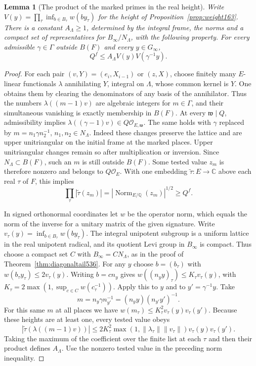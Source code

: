 \documentclass[a4paper,11pt]{article}
\newtheorem{lemma}[proposition]{Lemma}
\theoremstyle{definition}
\theoremstyle{remark}
\numberwithin{equation}{section}
\begin{document}
\begin{lemma}[The product of the marked primes in the real height]
\leavevmode\label{lem:frameheight540}
Write \(V(y)=\prod_\tau\inf_{b\in B_\tau}w(by_\tau)\) for the
height of Proposition~\ref{prop:weight163}. There is a constant
\(A_\Lambda\ge1\), determined by the integral frame, the norms
and a compact set of representatives for \(B_\infty/N_\Lambda\),
with the following property. For every admissible \(\gamma\in\Gamma\)
outside \(B(F)\) and every \(y\in G_\infty\),
\[
                   Q^f\le A_\Lambda V(y)V(\gamma^{-1}y).
\]
\end{lemma}
\begin{proof}
For each pair \((v,Y)=(e_i,X_{i-1})\) or \((z,X)\), choose
finitely many \(E\)-linear functionals \(\lambda\) annihilating
\(Y\), integral on \(\Lambda\), whose common kernel is \(Y\).
One obtains them by clearing the denominators of any basis of
the annihilator. Thus the numbers \(\lambda((m-1)v)\) are
algebraic integers for \(m\in\Gamma\), and their simultaneous
vanishing is exactly membership in \(B(F)\). At every
\(\mathfrak w\mid Q\), admissibility implies
\(\lambda((\gamma-1)v)\in Q\mathcal O_{E,\mathfrak w}\).
The same holds with \(\gamma\) replaced by
\(m=n_1\gamma n_2^{-1}\), \(n_1,n_2\in N_\Lambda\).
Indeed these changes preserve the lattice and are upper
unitriangular on the initial frame at the marked places.
Upper unitriangular changes remain so after multiplication
or inversion. Since \(N_\Lambda\subset B(F)\), such an
\(m\) is still outside \(B(F)\). Some tested value \(z_m\)
is therefore nonzero and belongs to \(Q\mathcal O_E\).
With one embedding \(\widetilde\tau:E\to\mathbb C\) above each
real \(\tau\) of \(F\), this implies
\[
        \prod_\tau|\widetilde\tau(z_m)|
          =|\operatorname{Norm}_{E/\mathbb Q}(z_m)|^{1/2}
          \ge Q^f .
\]

In signed orthonormal coordinates let \(w\) be the operator norm,
which equals the norm of the inverse for a unitary matrix of the
given signature. Write \(v_\tau(y)=\inf_{b\in B_\tau}w(by_\tau)\).
The integral unipotent subgroup is a uniform lattice in the real
unipotent radical, and its quotient Levi group in \(B_\infty\)
is compact. Thus choose a compact set \(C\) with
\(B_\infty=C N_\Lambda\), as in the proof of
Theorem~\ref{thm:diagonaltail536}. For any \(y\) choose
\(b=(b_\tau)\) with \(w(b_\tau y_\tau)\le2v_\tau(y)\).
Writing \(b=c n_y\) gives
\(w((n_yy)_\tau)\le K_\tau v_\tau(y)\), with
\(K_\tau=2\max(1,\sup_{c\in C}w(c_\tau^{-1}))\).
Apply this to \(y\) and to \(y'=\gamma^{-1}y\). Take
\[
      m=n_y\gamma n_{y'}^{-1}=(n_yy)(n_{y'}y')^{-1}.
\]
For this same \(m\) at all places we have
\(w(m_\tau)\le K_\tau^2v_\tau(y)v_\tau(y')\).
Because these heights are at least one, every tested value obeys
\[
  |\widetilde\tau(\lambda((m-1)v))|
    \le 2K_\tau^2\max(1,\|\lambda_\tau\|\|v_\tau\|)
                    v_\tau(y)v_\tau(y').
\]
Taking the maximum of the coefficient over the finite list at
each \(\tau\) and then their product defines \(A_\Lambda\).
Use the nonzero tested value in the preceding norm inequality.
\end{proof}
\end{document}
